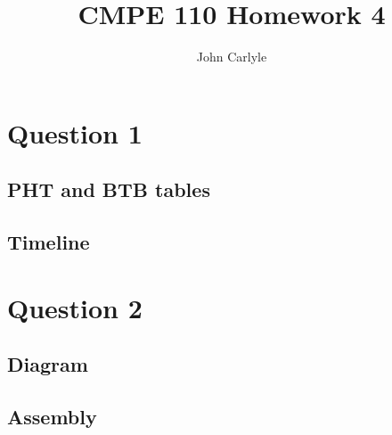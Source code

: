 \documentclass{article}
\title{CMPE 110 Homework 4}
\author{John Carlyle}
\begin{document}
\maketitle

\section{Question 1}
\subsection{PHT and BTB tables}

\subsection{Timeline}

\section{Question 2}
\subsection{Diagram}
\subsection{Assembly}
\end{document}
